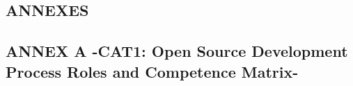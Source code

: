 \documentclass{template/openetcs_article}
\begin{document}
\newpage
\begin{landscape}
\section{ANNEXES}

\subsection{ANNEX A -CAT1: Open Source Development Process Roles and Competence Matrix-}




\end{landscape}
\end{document}
